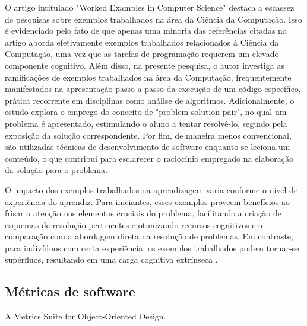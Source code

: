O artigo intitulado "Worked Examples in Computer Science" \cite{Skudder-LuxtonReilly:2014} destaca a escassez de pesquisas sobre exemplos trabalhados na área da Ciência da Computação. Isso é evidenciado pelo fato de que apenas uma minoria das referências citadas no artigo aborda efetivamente exemplos trabalhados relacionados à Ciência da Computação, uma vez que as tarefas de programação requerem um elevado componente cognitivo. Além disso, na presente pesquisa, o autor investiga as ramificações de exemplos trabalhados na área da Computação, frequentemente manifestados na apresentação passo a passo da execução de um código específico, prática recorrente em disciplinas como análise de algoritmos. Adicionalmente, o estudo explora o emprego do conceito de "problem solution pair", no qual um problema é apresentado, estimulando o aluno a tentar resolvê-lo, seguido pela exposição da solução correspondente. Por fim, de maneira menos convencional, são utilizadas técnicas de desenvolvimento de software enquanto se leciona um conteúdo, o que contribui para esclarecer o raciocínio empregado na elaboração da solução para o problema.

O impacto dos exemplos trabalhados na aprendizagem varia conforme o nível de experiência do aprendiz. Para iniciantes, esses exemplos proveem benefícios ao frisar a atenção nos elementos cruciais do problema, facilitando a criação de esquemas de resolução pertinentes e otimizando recursos cognitivos em comparação com a abordagem direta na resolução de problemas. Em contraste, para indivíduos com certa experiência, os exemplos trabalhados podem tornar-se supérfluos, resultando em uma carga cognitiva extrínseca \cite{Skudder-LuxtonReilly:2014}.

\cite{Simone.Tonhao-etal:2021}
\cite{Simone.Tonhao-etal:2022}
\cite{Tiago.Bonetti-etal:2023}


\subsection{Métricas de software}

A Metrics Suite for Object-Oriented Design.
\cite{MetricsSuite}

